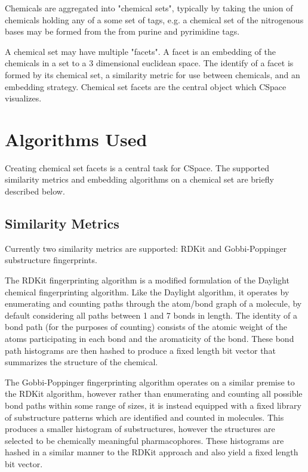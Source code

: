 \documentclass[12pt]{article}
\begin{document}
Chemicals are aggregated into "chemical sets", typically by taking the union of chemicals holding any of a some set of tags, e.g. a chemical set of the nitrogenous bases may be formed from the from purine and pyrimidine tags.

A chemical set may have multiple "facets". A facet is an embedding of the chemicals in a set to a 3 dimensional euclidean space. The identify of a facet is formed by its chemical set, a similarity metric for use between chemicals, and an embedding strategy. Chemical set facets are the central object which CSpace visualizes.

\section{Algorithms Used}
Creating chemical set facets is a central task for CSpace. The supported similarity metrics and embedding algorithms on a chemical set are briefly described below.

\subsection{Similarity Metrics}
Currently two similarity metrics are supported: RDKit and Gobbi-Poppinger substructure fingerprints.

The RDKit fingerprinting algorithm\cite{landrum_2007} is a modified formulation of the Daylight chemical fingerprinting algorithm\cite{daylighttheorymanual_2019}. Like the Daylight algorithm, it operates by enumerating and counting paths through the atom/bond graph of a molecule, by default considering all paths between 1 and 7 bonds in length. The identity of a bond path (for the purposes of counting) consists of the atomic weight of the atoms participating in each bond and the aromaticity of the bond. These bond path histograms are then hashed to produce a fixed length bit vector that summarizes the structure of the chemical.

The Gobbi-Poppinger fingerprinting algorithm\cite{Gobbi1998} operates on a similar premise to the RDKit algorithm, however rather than enumerating and counting all possible bond paths within some range of sizes, it is instead equipped with a fixed library of substructure patterns which are identified and counted in molecules. This produces a smaller histogram of substructures, however the structures are selected to be chemically meaningful pharmacophores. These histograms are hashed in a similar manner to the RDKit approach and also yield a fixed length bit vector.
\end{document}
